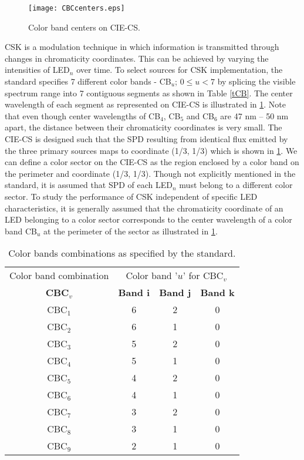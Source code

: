 \begin{figure}[b]
\centering
		\texttt{[image: CBCcenters.eps]}
	\caption{Color band centers on CIE-CS.}
	\label{figCBCcenters}
\end{figure}

CSK is a modulation technique in which information is transmitted through changes in chromaticity coordinates. This can be achieved by varying the intensities of LED$_{n}$ over time. To select sources for CSK implementation, the standard specifies 7 different color bands - CB$_{u}$; $0\leq u < 7$ by splicing the visible spectrum range into 7 contiguous segments as shown in Table \ref{tCB}. The center wavelength of each segment as represented on CIE-CS is illustrated in \figurename{ }\ref{figCBCcenters}. Note that even though center wavelengths of CB$_{4}$, CB$_{5}$ and CB$_{6}$ are 47 nm -- 50 nm apart, the distance between their chromaticity coordinates is very small. The CIE-CS is designed such that the SPD resulting from identical flux emitted by the three primary sources maps to coordinate (1/3, 1/3) which is shown in \figurename{ }\ref{figCBCcenters}. We can define a color sector on the CIE-CS as the region enclosed by a color band on the perimeter and coordinate (1/3, 1/3). Though not explicitly mentioned in the standard, it is assumed that SPD of each LED$_{n}$ must belong to a different color sector. To study the performance of CSK independent of specific LED characteristics, it is generally assumed that the chromaticity coordinate of an LED belonging to a color sector corresponds to the center wavelength of a color band CB$_{u}$ at the perimeter of the sector as illustrated in \figurename{ }\ref{figCBCcenters}.

\renewcommand{\arraystretch}{1.1}
\begin{table}[t]
\centering
\begin{tabular}{|c|c|c|c|}
\hline
Color band combination & \multicolumn{3}{c|}{Color band '$u$' for CBC$_{v}$} \\
\cline{2-4}
\textbf{CBC$_{v}$} & \textbf{Band i} & \textbf{Band j} & \textbf{Band k} \\
\hline
CBC$_{1}$ & 6 & 2 & 0 \\
\hline
CBC$_{2}$ & 6 & 1 & 0 \\
\hline
CBC$_{3}$ & 5 & 2 & 0 \\
\hline
CBC$_{4}$ & 5 & 1 & 0 \\
\hline
CBC$_{5}$ & 4 & 2 & 0 \\
\hline
CBC$_{6}$ & 4 & 1 & 0 \\
\hline
CBC$_{7}$ & 3 & 2 & 0 \\
\hline
CBC$_{8}$ & 3 & 1 & 0 \\
\hline
CBC$_{9}$ & 2 & 1 & 0 \\
\hline
\end{tabular}
\caption{Color bands combinations as specified by the standard.}
\label{tCBC}
\end{table}
\renewcommand{\arraystretch}{1.0}

